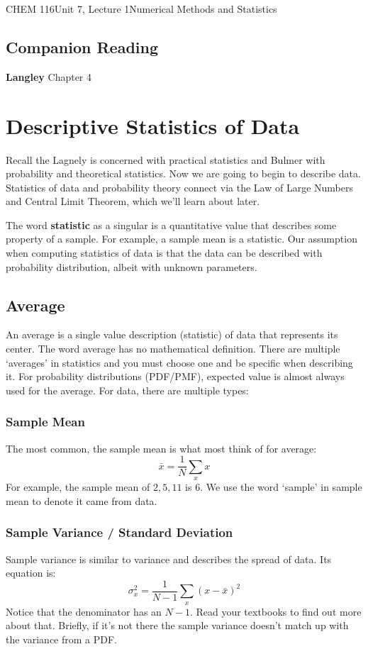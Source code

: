 \documentclass{article}
\begin{document}
\begin{tdoc}{CHEM 116}{Unit 7, Lecture 1}{Numerical Methods and Statistics}

  \subsection*{Companion Reading}
  \textbf{Langley} Chapter 4


\section{Descriptive Statistics of Data}
Recall the Lagnely is concerned with practical statistics and Bulmer
with probability and theoretical statistics. Now we are going to begin
to describe data. Statistics of data and probability
theory connect via the Law of Large Numbers and Central Limit Theorem, which we'll learn about later.

The word {\bf statistic} as a singular is a quantitative value that
describes some property of a sample. For example, a sample mean is a
statistic. Our assumption when computing statistics of data is that the data can be described with probability distribution, albeit with unknown parameters.

\subsection{Average}
An average is a single value description (statistic) of data that represents its
center. The word average has no mathematical definition. There are
multiple `averages' in statistics and you must choose one and be
specific when describing it. For probability distributions (PDF/PMF),
expected value is almost always used for the average. For data, there
are multiple types:

\subsubsection{Sample Mean}
The most common, the sample mean is what most think of for average:
\begin{equation}
\bar{x} = \frac{1}{N}\sum_x x
\end{equation}
For example, the sample mean of $2,5,11$ is 6. We use the word
`sample' in sample mean to denote it came from data.

\subsubsection{Sample Variance / Standard Deviation}
Sample variance is similar to variance and describes the spread of
data. Its equation is:
\begin{equation}
\sigma_x^2 = \frac{1}{N - 1} \sum_x (x - \bar{x})^2
\end{equation}
Notice that the denominator has an $N - 1$. Read your textbooks to
find out more about that. Briefly, if it's not there the sample
variance doesn't match up with the variance from a PDF.


\end{tdoc}
\end{document}
